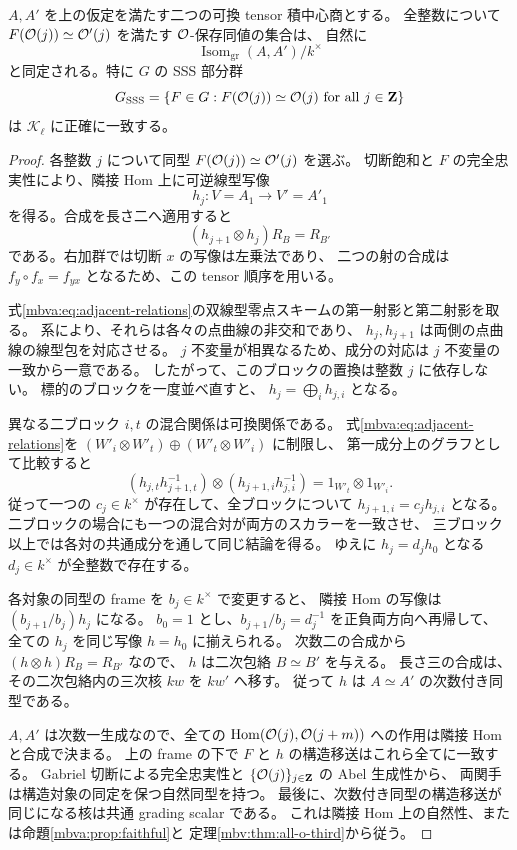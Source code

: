 \begin{theorem}
\label{mbva:thm:sss}
$A,A'$ を上の仮定を満たす二つの可換 tensor 積中心商とする。
全整数について
$F(\mathcal O(j))\simeq\mathcal O'(j)$ を満たす $\mathcal O$-保存同値の集合は、
自然に
\[
 \operatorname{Isom}_{\mathrm{gr}}(A,A')/k^\times
\]
と同定される。特に $G$ の SSS 部分群
\[
 G_{\mathrm{SSS}}=
 \{F\in G:F(\mathcal O(j))\simeq\mathcal O(j)\ \text{for all }j\in\mathbf Z\}
\]
は $\mathcal K_\ell$ に正確に一致する。
\end{theorem}
\begin{proof}
各整数 $j$ について同型 $F(\mathcal O(j))\simeq\mathcal O'(j)$ を選ぶ。
切断飽和と $F$ の完全忠実性により、隣接 Hom 上に可逆線型写像
\[
 h_j:V=A_1\longrightarrow V'=A'_1
\]
を得る。合成を長さ二へ適用すると
\begin{equation}\label{mbva:eq:adjacent-relations}
 (h_{j+1}\otimes h_j)R_B=R_{B'}
\end{equation}
である。右加群では切断 $x$ の写像は左乗法であり、
二つの射の合成は $f_y\circ f_x=f_{yx}$ となるため、この tensor 順序を用いる。

式\eqref{mbva:eq:adjacent-relations}の双線型零点スキームの第一射影と第二射影を取る。
系により、それらは各々の点曲線の非交和であり、
$h_j,h_{j+1}$ は両側の点曲線の線型包を対応させる。
$j$ 不変量が相異なるため、成分の対応は $j$ 不変量の一致から一意である。
したがって、このブロックの置換は整数 $j$ に依存しない。
標的のブロックを一度並べ直すと、
$h_j=\bigoplus_i h_{j,i}$ となる。

異なる二ブロック $i,t$ の混合関係は可換関係である。
式\eqref{mbva:eq:adjacent-relations}を
$(W'_i\otimes W'_t)\oplus(W'_t\otimes W'_i)$ に制限し、
第一成分上のグラフとして比較すると
\[
 (h_{j,t}h_{j+1,t}^{-1})
       \otimes(h_{j+1,i}h_{j,i}^{-1})
   =1_{W'_t}\otimes1_{W'_i}.
\]
従って一つの $c_j\in k^\times$ が存在して、全ブロックについて
$h_{j+1,i}=c_jh_{j,i}$ となる。
二ブロックの場合にも一つの混合対が両方のスカラーを一致させ、
三ブロック以上では各対の共通成分を通して同じ結論を得る。
ゆえに $h_j=d_jh_0$ となる $d_j\in k^\times$ が全整数で存在する。

各対象の同型の frame を $b_j\in k^\times$ で変更すると、
隣接 Hom の写像は $(b_{j+1}/b_j)h_j$ になる。
$b_0=1$ とし、$b_{j+1}/b_j=d_j^{-1}$ を正負両方向へ再帰して、
全ての $h_j$ を同じ写像 $h=h_0$ に揃えられる。
次数二の合成から $(h\otimes h)R_B=R_{B'}$ なので、
$h$ は二次包絡 $B\simeq B'$ を与える。
長さ三の合成は、その二次包絡内の三次核 $kw$ を $kw'$ へ移す。
従って $h$ は $A\simeq A'$ の次数付き同型である。

$A,A'$ は次数一生成なので、全ての
$\operatorname{Hom}(\mathcal O(j),\mathcal O(j+m))$ への作用は隣接 Hom と合成で決まる。
上の frame の下で $F$ と $h$ の構造移送はこれら全てに一致する。
Gabriel 切断による完全忠実性と $\{\mathcal O(j)\}_{j\in\mathbf Z}$ の Abel 生成性から、
両関手は構造対象の同定を保つ自然同型を持つ。
最後に、次数付き同型の構造移送が同じになる核は共通 grading scalar である。
これは隣接 Hom 上の自然性、または命題\ref{mbva:prop:faithful}と
定理\ref{mbv:thm:all-o-third}から従う。
\end{proof}

